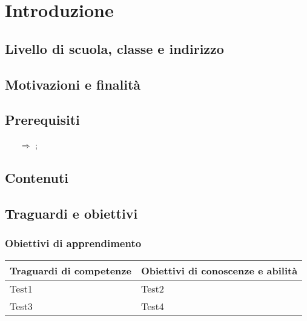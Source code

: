 \chapter{Introduzione}

\section{Livello di scuola, classe e indirizzo}


\sol{}


\sol{}

\section{Motivazioni e finalità}


\sol{}

\section{Prerequisiti}

\begin{itemize}
    \item [$\Rightarrow$];
\end{itemize}

\section{Contenuti}

\section{Traguardi e obiettivi}

\subsection{Obiettivi di apprendimento}


\begin{center}
    \begin{tabular}{ || p{5cm} | p{8cm} ||}
    \hline\hline

    \textbf{Traguardi di competenze} & \textbf{Obiettivi di conoscenze e abilità} \\ \hline
        
        Test1 & Test2 \\\hline
        Test3 & Test4 \\\hline
    
    \hline
    \end{tabular}
\end{center}